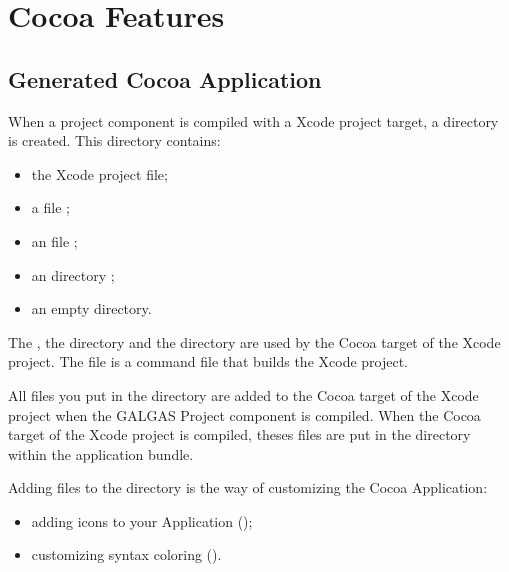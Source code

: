 
\chapter{Cocoa Features}


\section{Generated Cocoa Application}

When a project component is compiled with a Xcode project target, a  directory is created. This directory contains:
\begin{itemize}
\item the Xcode project file;
\item a  file ;
\item an  file ;
\item an  directory ;
\item an empty  directory.
\end{itemize}

The , the  directory and the  directory are used by the Cocoa target of the Xcode project. The  file is a command file that builds the Xcode project.

All files you put in the  directory are added to the Cocoa target of the Xcode project when the GALGAS Project component is compiled. When the Cocoa target of the Xcode project is compiled, theses files are put in the  directory within the application bundle.

Adding files to the  directory is the way of customizing the Cocoa Application:
\begin{itemize}
\item adding icons to your Application ();
\item customizing syntax coloring (). 
\end{itemize}





